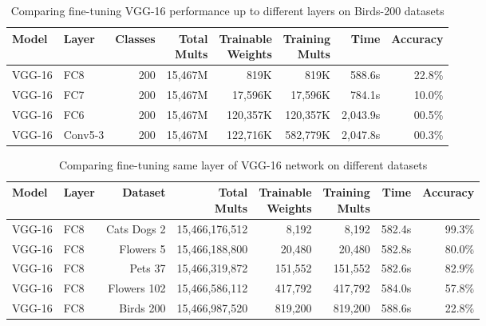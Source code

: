 \begin{table*}\caption{Comparing fine-tuning VGG-16 performance up to different layers on Birds-200 datasets\autocite{WahCUB_200_2011} }\label{table:fine-tune-vgg16-birds200}
\centering
\begin{small}
\begin{tabularx}{\textwidth}{llrrrrrr}
\toprule
Model & Layer & Classes & \makecell{Total \\ Mults} & \makecell{Trainable \\ Weights} & \makecell{Training \\ Mults} & Time & Accuracy \\
\midrule
VGG-16 & FC8     & 200 & 15,467M &     819K &     819K &   588.6s & 22.8\% \\
VGG-16 & FC7     & 200 & 15,467M &  17,596K &  17,596K &   784.1s & 10.0\% \\
VGG-16 & FC6     & 200 & 15,467M & 120,357K & 120,357K & 2,043.9s & 00.5\% \\
VGG-16 & Conv5-3 & 200 & 15,467M & 122,716K & 582,779K & 2,047.8s & 00.3\% \\
\bottomrule
\end{tabularx}
\end{small}
\end{table*}

\begin{table*}\caption{Comparing fine-tuning same layer of VGG-16 network on different datasets}\label{table:fine-tune-vgg16-2}
\centering
\begin{small}
\begin{tabularx}{\textwidth}{llrrrrrr}
\toprule
Model & Layer & Dataset & \makecell{Total \\ Mults} & \makecell{Trainable \\ Weights} & \makecell{Training \\ Mults} & Time & Accuracy \\
\midrule
VGG-16 & FC8  & Cats Dogs 2   & 15,466,176,512 &   8,192 &   8,192 &   582.4s & 99.3\% \\
VGG-16 & FC8  & Flowers 5     & 15,466,188,800 &  20,480 &  20,480 &   582.8s & 80.0\% \\
VGG-16 & FC8  & Pets 37       & 15,466,319,872 & 151,552 & 151,552 &   582.6s & 82.9\% \\
VGG-16 & FC8  & Flowers 102   & 15,466,586,112 & 417,792 & 417,792 &   584.0s & 57.8\% \\
VGG-16 & FC8  & Birds 200     & 15,466,987,520 & 819,200 & 819,200 &   588.6s & 22.8\% \\
\bottomrule
\end{tabularx}
\end{small}
\end{table*}

